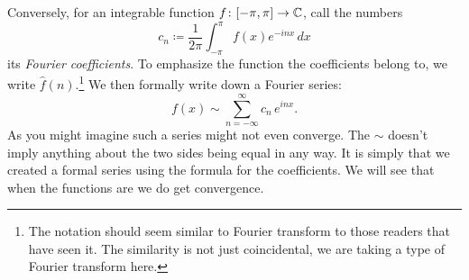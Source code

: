 Conversely, for an integrable function $f \colon [-\pi,\pi] \to
{\mathbb{C}}$, call the numbers
\begin{equation*}
c_n \coloneqq 
\frac{1}{2\pi} \int_{-\pi}^\pi
f(x) e^{-inx} \, dx
\end{equation*}
its \emph{Fourier coefficients}.  To emphasize the function
the coefficients belong to,
we write $\hat{f}(n)$.\footnote{The notation should seem similar
to Fourier transform to those readers that have seen it.
The similarity is not just
coincidental, we are taking a type of Fourier transform here.}
We then formally write down a Fourier series:
\begin{equation*}
f(x) \sim
\sum_{n=-\infty}^\infty c_n \, e^{inx} .
\end{equation*}
As you might imagine such a series might not even converge.
The $\sim$ doesn't imply anything about the two sides being equal
in any way.  It is simply that we created a formal series using the formula
for the coefficients.  We will see that when the functions are
 we do get convergence.

